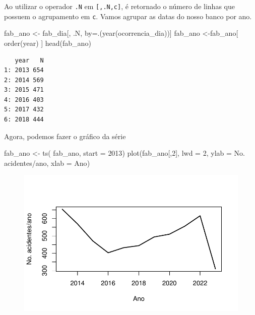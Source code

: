 \documentclass[
  letterpaper,
  DIV=11,
  numbers=noendperiod]{scrreprt}
\newenvironment{Shaded}{\begin{snugshade}}{\end{snugshade}}
\newcommand{\AttributeTok}[1]{\textcolor[rgb]{0.40,0.45,0.13}{#1}}
\newcommand{\DecValTok}[1]{\textcolor[rgb]{0.68,0.00,0.00}{#1}}
\newcommand{\FunctionTok}[1]{\textcolor[rgb]{0.28,0.35,0.67}{#1}}
\newcommand{\NormalTok}[1]{\textcolor[rgb]{0.00,0.23,0.31}{#1}}
\newcommand{\OtherTok}[1]{\textcolor[rgb]{0.00,0.23,0.31}{#1}}
\newcommand{\StringTok}[1]{\textcolor[rgb]{0.13,0.47,0.30}{#1}}
\begin{document}
Ao utilizar o operador \texttt{.N} em \texttt{{[},.N,c{]}}, é retornado
o número de linhas que possuem o agrupamento em \texttt{c}. Vamos
agrupar as datas do nosso banco por ano.

\begin{Shaded}
\begin{Highlighting}[]
\NormalTok{fab\_ano }\OtherTok{\textless{}{-}}\NormalTok{ fab\_dia[, .N, by}\OtherTok{=}\NormalTok{.(}\FunctionTok{year}\NormalTok{(ocorrencia\_dia))]}
\NormalTok{fab\_ano }\OtherTok{\textless{}{-}}\NormalTok{fab\_ano[ }\FunctionTok{order}\NormalTok{(year) ]}
\FunctionTok{head}\NormalTok{(fab\_ano)}
\end{Highlighting}
\end{Shaded}

\begin{verbatim}
   year   N
1: 2013 654
2: 2014 569
3: 2015 471
4: 2016 403
5: 2017 432
6: 2018 444
\end{verbatim}

Agora, podemos fazer o gráfico da série

\begin{Shaded}
\begin{Highlighting}[]
\NormalTok{fab\_ano }\OtherTok{\textless{}{-}} \FunctionTok{ts}\NormalTok{( fab\_ano, }\AttributeTok{start =} \DecValTok{2013}\NormalTok{)}
\FunctionTok{plot}\NormalTok{(fab\_ano[,}\DecValTok{2}\NormalTok{], }\AttributeTok{lwd =} \DecValTok{2}\NormalTok{, }\AttributeTok{ylab =} \StringTok{\textquotesingle{}No. acidentes/ano\textquotesingle{}}\NormalTok{, }\AttributeTok{xlab =} \StringTok{\textquotesingle{}Ano\textquotesingle{}}\NormalTok{)}
\end{Highlighting}
\end{Shaded}

\begin{figure}[H]

{\centering \includegraphics{intro_files/figure-pdf/unnamed-chunk-10-1.pdf}

}

\end{figure}
\end{document}
